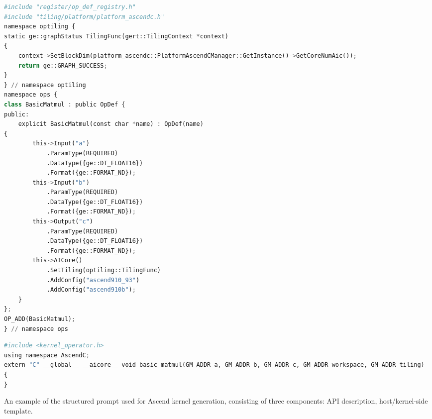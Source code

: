 \begin{table}[H]
\begin{tcolorbox}
\begin{tcolorbox}[
      sharp corners,
      colframe=refgreen,
      colback=refgreen!5,
      colbacktitle=refgreen!15,
      coltitle=refgreen,
      boxrule=0.4pt,
      title={\textbf{Host template}},
      fonttitle=\bfseries\small,
      left=0pt,
      right=0pt,
      top=-4pt,
      bottom=-4pt
    ]
      \begin{center}
        \begin{lstlisting}[style=mystyle, frame=none,framerule=0pt, language=Python]
#include "register/op_def_registry.h" 
#include "tiling/platform/platform_ascendc.h" 
namespace optiling { 
static ge::graphStatus TilingFunc(gert::TilingContext *context) 
{ 
    context->SetBlockDim(platform_ascendc::PlatformAscendCManager::GetInstance()->GetCoreNumAic()); 
    return ge::GRAPH_SUCCESS; 
} 
} // namespace optiling 
namespace ops { 
class BasicMatmul : public OpDef { 
public: 
    explicit BasicMatmul(const char *name) : OpDef(name) 
{ 
        this->Input("a") 
            .ParamType(REQUIRED) 
            .DataType({ge::DT_FLOAT16}) 
            .Format({ge::FORMAT_ND}); 
        this->Input("b") 
            .ParamType(REQUIRED) 
            .DataType({ge::DT_FLOAT16}) 
            .Format({ge::FORMAT_ND}); 
        this->Output("c") 
            .ParamType(REQUIRED) 
            .DataType({ge::DT_FLOAT16}) 
            .Format({ge::FORMAT_ND}); 
        this->AICore() 
            .SetTiling(optiling::TilingFunc) 
            .AddConfig("ascend910_93") 
            .AddConfig("ascend910b"); 
    } 
}; 
OP_ADD(BasicMatmul); 
} // namespace ops
\end{lstlisting}
\end{center}
\end{tcolorbox}

\begin{tcolorbox}[
      sharp corners,
      colframe=refgreen,
      colback=refgreen!5,
      colbacktitle=refgreen!15,
      coltitle=refgreen,
      boxrule=0.4pt,
      title={\textbf{Kernel template}},
      fonttitle=\bfseries\small,
      left=0pt,
      right=0pt,
      top=-4pt,
      bottom=-5pt
    ]
      \begin{center}
        \begin{lstlisting}[style=mystyle, frame=none,framerule=0pt, language=Python]
#include <kernel_operator.h> 
using namespace AscendC; 
extern "C" __global__ __aicore__ void basic_matmul(GM_ADDR a, GM_ADDR b, GM_ADDR c, GM_ADDR workspace, GM_ADDR tiling) 
{ 
}
\end{lstlisting}
\end{center}
\end{tcolorbox}
\end{tcolorbox}
\vspace{-10pt}
\caption{An example of the structured prompt used for Ascend kernel generation, consisting of three components: API description, host/kernel-side template.}
\label{tab:kernel_gen}
\end{table}


